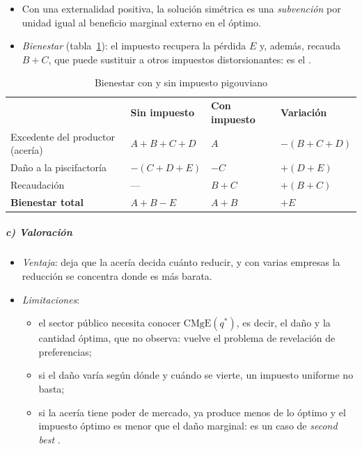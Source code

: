\documentclass[11pt]{article}
\begin{document}
\begin{itemize}
\item Con una externalidad positiva, la solución simétrica es una \emph{subvención} por unidad igual al beneficio marginal externo en el óptimo.
\item \emph{Bienestar} (tabla~\ref{tab:pigou-bienestar}): el impuesto recupera la pérdida $E$ y, además, recauda $B+C$, que puede sustituir a otros impuestos distorsionantes: es el  .
\end{itemize}

\begin{table}[H]
\centering
\caption{Bienestar con y sin impuesto pigouviano}\label{tab:pigou-bienestar}
\begin{tabular}{>{\centering\arraybackslash}m{4.4cm}|>{\centering\arraybackslash}m{2.7cm}|>{\centering\arraybackslash}m{2.7cm}|>{\centering\arraybackslash}m{2.7cm}}
\rowcolor{tceeazulpalido} & \textbf{Sin impuesto} & \textbf{Con impuesto} & \textbf{Variación} \\ \hhline{-|-|-|-|}
Excedente del productor (acería) & $A+B+C+D$ & $A$ & $-(B+C+D)$ \\ \hhline{-|-|-|-|}
Daño a la piscifactoría & $-(C+D+E)$ & $-C$ & $+(D+E)$ \\ \hhline{-|-|-|-|}
Recaudación & --- & $B+C$ & $+(B+C)$ \\ \hhline{-|-|-|-|}
\cellcolor{tceesalvia}\textbf{Bienestar total} & \cellcolor{tceesalvia}$A+B-E$ & \cellcolor{tceesalvia}$A+B$ & \cellcolor{tceesalvia}$+E$ \\
\end{tabular}
\end{table}

\subparagraph{c) Valoración}
\begin{itemize}
\item \emph{Ventaja}: deja que la acería decida cuánto reducir, y con varias empresas la reducción se concentra donde es más barata.
\item \emph{Limitaciones}:
  \begin{itemize}
  \item el sector público necesita conocer $\mathrm{CMgE}(q^*)$, es decir, el daño y la cantidad óptima, que no observa: vuelve el problema de revelación de preferencias;
  \item si el daño varía según dónde y cuándo se vierte, un impuesto uniforme no basta;
  \item si la acería tiene poder de mercado, ya produce menos de lo óptimo y el impuesto óptimo es menor que el daño marginal\nocite{Buchanan1969External}: es un caso de \emph{second best} .
  \end{itemize}
\end{itemize}
\end{document}
